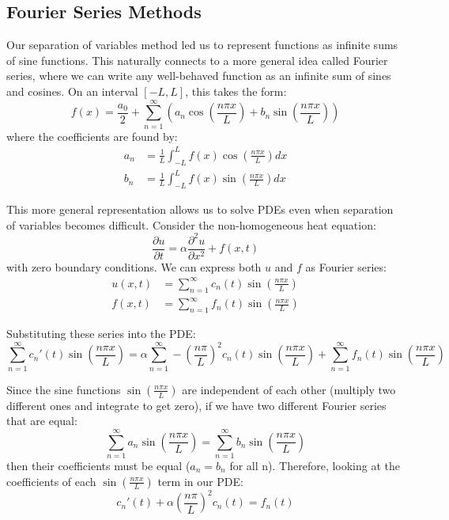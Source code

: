 \subsection*{Fourier Series Methods} 

\noindent Our separation of variables method led us to represent functions as infinite sums of sine functions. This naturally connects to a more general idea called Fourier series, where we can write any well-behaved function as an infinite sum of sines and cosines. On an interval $[-L,L]$, this takes the form:
\[
f(x) = \frac{a_0}{2} + \sum_{n=1}^{\infty}\left(a_n\cos\left(\frac{n\pi x}{L}\right) + b_n\sin\left(\frac{n\pi x}{L}\right)\right)
\]
where the coefficients are found by:
\begin{align*}
a_n &= \frac{1}{L}\int_{-L}^L f(x)\cos\left(\frac{n\pi x}{L}\right)dx \\
b_n &= \frac{1}{L}\int_{-L}^L f(x)\sin\left(\frac{n\pi x}{L}\right)dx
\end{align*}

\noindent This more general representation allows us to solve PDEs even when separation of variables becomes difficult. Consider the non-homogeneous heat equation:
\[
\frac{\partial u}{\partial t} = \alpha\frac{\partial^2 u}{\partial x^2} + f(x,t)
\]
with zero boundary conditions. We can express both $u$ and $f$ as Fourier series:
\begin{align*}
u(x,t) &= \sum_{n=1}^{\infty} c_n(t)\sin\left(\frac{n\pi x}{L}\right) \\
f(x,t) &= \sum_{n=1}^{\infty} f_n(t)\sin\left(\frac{n\pi x}{L}\right)
\end{align*}

\noindent Substituting these series into the PDE:
\[
\sum_{n=1}^{\infty} c_n'(t)\sin\left(\frac{n\pi x}{L}\right) = \alpha\sum_{n=1}^{\infty} -\left(\frac{n\pi}{L}\right)^2c_n(t)\sin\left(\frac{n\pi x}{L}\right) + \sum_{n=1}^{\infty} f_n(t)\sin\left(\frac{n\pi x}{L}\right)
\]

\noindent Since the sine functions $\sin(\frac{n\pi x}{L})$ are independent of each other (multiply two different ones and integrate to get zero), if we have two different Fourier series that are equal:
\[
\sum_{n=1}^{\infty} a_n\sin\left(\frac{n\pi x}{L}\right) = \sum_{n=1}^{\infty} b_n\sin\left(\frac{n\pi x}{L}\right)
\]
then their coefficients must be equal ($a_n = b_n$ for all n). Therefore, looking at the coefficients of each $\sin(\frac{n\pi x}{L})$ term in our PDE:
\[
c_n'(t) + \alpha\left(\frac{n\pi}{L}\right)^2c_n(t) = f_n(t)
\]

